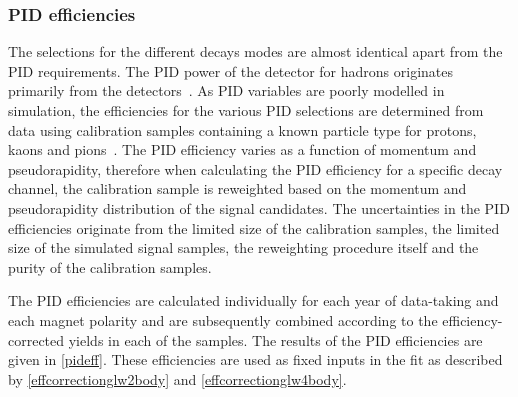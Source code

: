 \subsubsection{PID efficiencies}
\label{sec:cpfit:efficiencies:pid}

The selections for the different \Dz decays modes are almost identical apart from the PID requirements. The PID power of the detector for hadrons originates primarily from the \rich detectors~\cite{LHCb-DP-2012-003,richrun2}. As PID variables are poorly modelled in \lhcb simulation, the efficiencies for the various PID selections are determined from data using calibration samples containing a known particle type for protons, kaons and pions~\cite{LHCb-PUB-2016-021,LHCb-PUB-2016-005}. The PID efficiency varies as a function of momentum and pseudorapidity, therefore when calculating the PID efficiency for a specific decay channel, the calibration sample is reweighted based on the momentum and pseudorapidity distribution of the signal candidates. The uncertainties in the PID efficiencies originate from the limited size of the calibration samples, the limited size of the simulated signal samples, the reweighting procedure itself and the purity of the calibration samples.

The PID efficiencies are calculated individually for each year of data-taking and each magnet polarity and are subsequently combined according to the efficiency-corrected yields in each of the samples. The results of the PID efficiencies are given in \tab\ref{pideff}. These efficiencies are used as fixed inputs in the \CP fit as described by \eqns\ref{effcorrectionglw2body} and \ref{effcorrectionglw4body}. 

\begin{table}[h]
\centering
{}
\caption{Summary of the PID efficiencies used in the \CP fit.}
\label{pideff}
\end{table}

